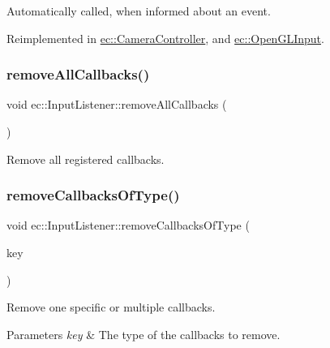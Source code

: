 Automatically called, when informed about an event. 



Reimplemented in \mbox{\hyperlink{classec_1_1_camera_controller_af44aad5f80005eaadf5d637b3b00c6d6}{ec\+::\+Camera\+Controller}}, and \mbox{\hyperlink{classec_1_1_open_g_l_input_a064a4e318e18d79ad8df19c789f84686}{ec\+::\+Open\+G\+L\+Input}}.

\mbox{\label{classec_1_1_input_listener_ab3c4085477da60677e0a0659f750ead4}} 
\subsubsection{\texorpdfstring{remove\+All\+Callbacks()}{removeAllCallbacks()}}
{\footnotesize\ttfamily void ec\+::\+Input\+Listener\+::remove\+All\+Callbacks (\begin{DoxyParamCaption}{ }\end{DoxyParamCaption})}



Remove all registered callbacks. 

\mbox{\label{classec_1_1_input_listener_a66e75fbfd13ec7cf87be9bebf2e02be8}} 
\subsubsection{\texorpdfstring{remove\+Callbacks\+Of\+Type()}{removeCallbacksOfType()}}
{\footnotesize\ttfamily void ec\+::\+Input\+Listener\+::remove\+Callbacks\+Of\+Type (\begin{DoxyParamCaption}\item[{\mbox{\hyperlink{classec_1_1_input_listener_af5dfb691564fa8e05fcf7f053e3c532b}{Event\+Key\+\_\+\+Type}}}]{key }\end{DoxyParamCaption})}



Remove one specific or multiple callbacks. 


\begin{DoxyParams}{Parameters}
{\em key} & The type of the callbacks to remove. \\
\hline
\end{DoxyParams}


